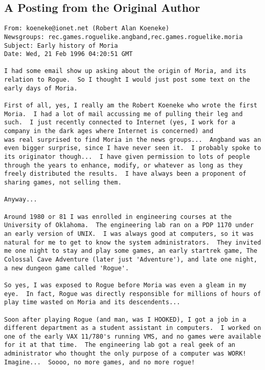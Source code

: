 \subsection{A Posting from the Original Author}

\begin{verbatim}
From: koeneke@ionet.net (Robert Alan Koeneke)
Newsgroups: rec.games.roguelike.angband,rec.games.roguelike.moria
Subject: Early history of Moria
Date: Wed, 21 Feb 1996 04:20:51 GMT

I had some email show up asking about the origin of Moria, and its
relation to Rogue.  So I thought I would just post some text on the
early days of Moria.

First of all, yes, I really am the Robert Koeneke who wrote the first
Moria.  I had a lot of mail accussing me of pulling their leg and
such.  I just recently connected to Internet (yes, I work for a
company in the dark ages where Internet is concerned) and 
was real surprised to find Moria in the news groups...  Angband was an
even bigger surprise, since I have never seen it.  I probably spoke to
its originator though...  I have given permission to lots of people
through the years to enhance, modify, or whatever as long as they
freely distributed the results.  I have always been a proponent of
sharing games, not selling them.

Anyway...

Around 1980 or 81 I was enrolled in engineering courses at the
University of Oklahoma.  The engineering lab ran on a PDP 1170 under
an early version of UNIX.  I was always good at computers, so it was
natural for me to get to know the system administrators.  They invited
me one night to stay and play some games, an early startrek game, The
Colossal Cave Adventure (later just 'Adventure'), and late one night,
a new dungeon game called 'Rogue'.

So yes, I was exposed to Rogue before Moria was even a gleam in my
eye.  In fact, Rogue was directly responsible for millions of hours of
play time wasted on Moria and its descendents...

Soon after playing Rogue (and man, was I HOOKED), I got a job in a
different department as a student assistant in computers.  I worked on
one of the early VAX 11/780's running VMS, and no games were available
for it at that time.  The engineering lab got a real geek of an
administrator who thought the only purpose of a computer was WORK!
Imagine...  Soooo, no more games, and no more rogue!


\end{verbatim}
